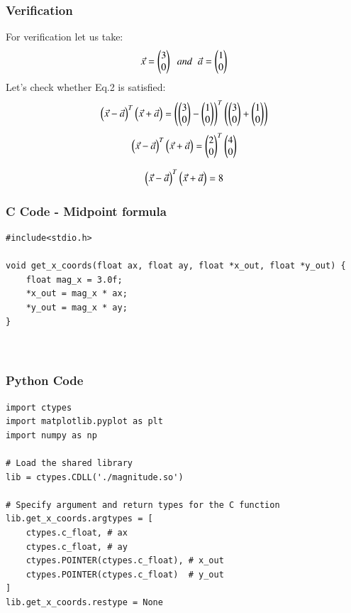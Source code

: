 \documentclass{beamer}
\begin{document}
\begin{frame}
\frametitle{Verification}
For verification let us take:
\begin{align}
    \Vec{x}=\begin{pmatrix}3\\0\end{pmatrix}\;\;and\;\;\Vec{a}=\begin{pmatrix}1\\0\end{pmatrix}
\end{align}
Let's check whether Eq.2 is satisfied:
\begin{align}
\begin{pmatrix}\Vec{x}-\Vec{a}\end{pmatrix}^T\begin{pmatrix}\Vec{x}+\Vec{a}\end{pmatrix}= \left(\begin{pmatrix}3\\0\end{pmatrix}-\begin{pmatrix}1\\0\end{pmatrix}\right)^T\left(\begin{pmatrix}3\\0\end{pmatrix}+\begin{pmatrix}1\\0\end{pmatrix}\right)
\end{align}
\begin{align}
    \begin{pmatrix}\Vec{x}-\Vec{a}\end{pmatrix}^T\begin{pmatrix}\Vec{x}+\Vec{a}\end{pmatrix}= \begin{pmatrix}2\\0\end{pmatrix}^T\begin{pmatrix}4\\0\end{pmatrix}
\end{align}

\begin{align}
    \begin{pmatrix}\Vec{x}-\Vec{a}\end{pmatrix}^T\begin{pmatrix}\Vec{x}+\Vec{a}\end{pmatrix}= 8
\end{align}

\end{frame}




\begin{frame}[fragile]
    \frametitle{C Code - Midpoint formula }

    \begin{lstlisting}
#include<stdio.h>

void get_x_coords(float ax, float ay, float *x_out, float *y_out) {
    float mag_x = 3.0f;
    *x_out = mag_x * ax;
    *y_out = mag_x * ay;
}



    \end{lstlisting}
\end{frame}


\begin{frame}[fragile]
    \frametitle{Python Code}
    \begin{lstlisting}
import ctypes
import matplotlib.pyplot as plt
import numpy as np

# Load the shared library
lib = ctypes.CDLL('./magnitude.so')

# Specify argument and return types for the C function
lib.get_x_coords.argtypes = [
    ctypes.c_float, # ax
    ctypes.c_float, # ay
    ctypes.POINTER(ctypes.c_float), # x_out
    ctypes.POINTER(ctypes.c_float)  # y_out
]
lib.get_x_coords.restype = None









    \end{lstlisting}
\end{frame}
\end{document}
